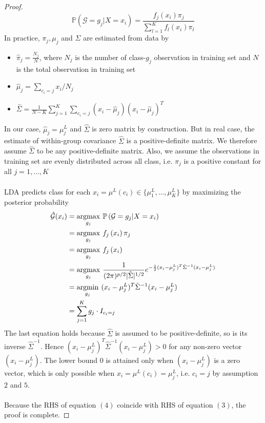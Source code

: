 \documentclass[11pt]{article}
\begin{document}
\begin{itemize}
\begin{proof}
\[	\mathbb{P}\left( \mathcal{G} = g_j | X=x_i  \right)  = \frac{f_j\left(x_i\right) \pi_j}{\sum^K_{l=1}f_l\left(x_i\right) \pi_l}	\]
In practice, $\pi_j, \mu_j$ and $\Sigma$ are estimated from data by
 \begin{itemize}
 	\item  $\hat{\pi}_j = \frac{N_j}{N}$, where $N_j$ is the number of class-$g_j$ observation in training set and $N$ is the total observation in training set
 	\item  $\hat{\mu}_j = \sum_{c_i=j} x_i/N_j$ 
 	\item  $\hat{\Sigma} = \frac{1}{N-K} \sum^K_{j=1}\sum_{c_i=j} (x_i - \hat{\mu}_j )(x_i - \hat{\mu}_j )^T$
 \end{itemize}
In our case, $\hat{\mu}_j = \mu^L_j$ and $\hat{\Sigma}$ is zero matrix by construction. But in real case, the estimate of within-group covariance $\hat{\Sigma}$ is a positive-definite matrix. We therefore assume $\hat{\Sigma}$ to be any positive-definite matrix. Also, we assume the observations in training set are evenly distributed across all class, i.e. $\pi_j$ is a positive constant for all $j = 1,...,K$ \\\\   
LDA predicts class for each $x_i = \mu^L(c_i)\in \{\mu^L_1,...,\mu^L_K\}$ by maximizing the posterior probability
\begin{align}
     \hat{\mathcal{G}}(x_i) & = \underset{g_j}{\operatorname{argmax}}\hspace{0.05 in} \mathbb{P}\left( \mathcal{G} = g_j | X=x_i  \right)  \nonumber   \\ 
     & = \underset{g_j}{\operatorname{argmax}}\hspace{0.05 in} f_j\left(x_i\right) \pi_j \nonumber \nonumber  \\
     & = \underset{g_j}{\operatorname{argmax}}\hspace{0.05 in} f_j\left(x_i\right) \nonumber  \nonumber  \\    
     & = \underset{g_j}{\operatorname{argmax}}\hspace{0.05 in}  \frac{1}{(2\pi)^{p/2}|\hat{\Sigma}|^{1/2}}e^{-\frac{1}{2}(x_i-\mu^L_j)^T\hat{\Sigma}^{-1}(x_i-\mu^L_j)	} \nonumber  \\  
     &=  \underset{g_j}{\operatorname{argmin}}\hspace{0.05 in} (x_i-\mu^L_j)^T\hat{\Sigma}^{-1}(x_i-\mu^L_j) \nonumber   \\  
     &= \sum^K_{j=1} g_j \cdot I_{c_i = j}
\end{align}
The last equation holds because $\hat{\Sigma}$ is assumed to be positive-definite, so is its inverse  $\hat{\Sigma}^{-1}$. Hence $(x_i-\mu^L_j)^T\hat{\Sigma}^{-1}(x_i-\mu^L_j) >0$ for any non-zero vector $(x_i-\mu^L_j)$. The lower bound $0$ is attained only when $(x_i-\mu^L_j)$ is a zero vector, which is only possible when $x_i=\mu^L(c_i) = \mu^L_j$, i.e. $c_i = j$ by assumption $2$ and $5$. \\\\
Because the RHS of equation $(4)$ coincide with RHS of equation $(3)$, the proof is complete.
\end{proof}
\end{itemize}
\end{document}
